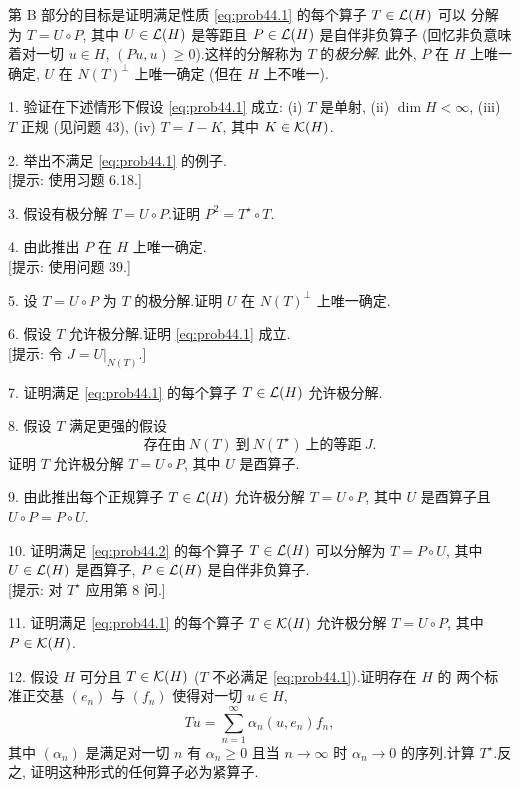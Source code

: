 \begin{problem}[第 5, 6 章]
第 B 部分的目标是证明满足性质 \eqref{eq:prob44.1} 的每个算子 $T\in\mathcal{L}(H)$ 可以
分解为 $T=U\circ P$, 其中 $U\in\mathcal{L}(H)$ 是等距且 $P\in\mathcal{L}(H)$ 是自伴非负算子
(回忆非负意味着对一切 $u\in H$, $(Pu,u)\ge0$).这样的分解称为 $T$ 的\emph{极分解}.
此外, $P$ 在 $H$ 上唯一确定, $U$ 在 $N(T)^\perp$ 上唯一确定 (但在 $H$ 上不唯一).

1. 验证在下述情形下假设 \eqref{eq:prob44.1} 成立:
(i) $T$ 是单射,
(ii) $\dim H<\infty$,
(iii) $T$ 正规 (见问题 43),
(iv) $T=I-K$, 其中 $K\in\mathcal{K}(H)$.

2. 举出不满足 \eqref{eq:prob44.1} 的例子.\\
{[提示: 使用习题 6.18.]}

3. 假设有极分解 $T=U\circ P$.证明 $P^2=T^\star\circ T$.

4. 由此推出 $P$ 在 $H$ 上唯一确定.\\
{[提示: 使用问题 39.]}

5. 设 $T=U\circ P$ 为 $T$ 的极分解.证明 $U$ 在 $N(T)^\perp$ 上唯一确定.

6. 假设 $T$ 允许极分解.证明 \eqref{eq:prob44.1} 成立.\\
{[提示: 令 $J=U|_{N(T)}$.]}

7. 证明满足 \eqref{eq:prob44.1} 的每个算子 $T\in\mathcal{L}(H)$ 允许极分解.

8. 假设 $T$ 满足更强的假设
\begin{equation}
\text{存在由}\ N(T)\ \text{到}\ N(T^\star)\ \text{上的等距}\ J.
\tag{2}
\label{eq:prob44.2}
\end{equation}
证明 $T$ 允许极分解 $T=U\circ P$, 其中 $U$ 是酉算子.

9. 由此推出每个正规算子 $T\in\mathcal{L}(H)$ 允许极分解 $T=U\circ P$, 其中 $U$ 是酉算子且
$U\circ P=P\circ U$.

10. 证明满足 \eqref{eq:prob44.2} 的每个算子 $T\in\mathcal{L}(H)$ 可以分解为 $T=P\circ U$,
其中 $U\in\mathcal{L}(H)$ 是酉算子, $P\in\mathcal{L}(H)$ 是自伴非负算子.\\
{[提示: 对 $T^\star$ 应用第 8 问.]}

11. 证明满足 \eqref{eq:prob44.1} 的每个算子 $T\in\mathcal{K}(H)$ 允许极分解 $T=U\circ P$,
其中 $P\in\mathcal{K}(H)$.

12. 假设 $H$ 可分且 $T\in\mathcal{K}(H)$ ($T$ 不必满足 \eqref{eq:prob44.1}).证明存在 $H$ 的
两个标准正交基 $(e_n)$ 与 $(f_n)$ 使得对一切 $u\in H$,
\begin{equation*}
Tu=\sum_{n=1}^\infty\alpha_n(u,e_n)f_n,
\end{equation*}
其中 $(\alpha_n)$ 是满足对一切 $n$ 有 $\alpha_n\ge0$ 且当 $n\to\infty$ 时 $\alpha_n\to0$
的序列.计算 $T^\star$.反之, 证明这种形式的任何算子必为紧算子.
\end{problem}

